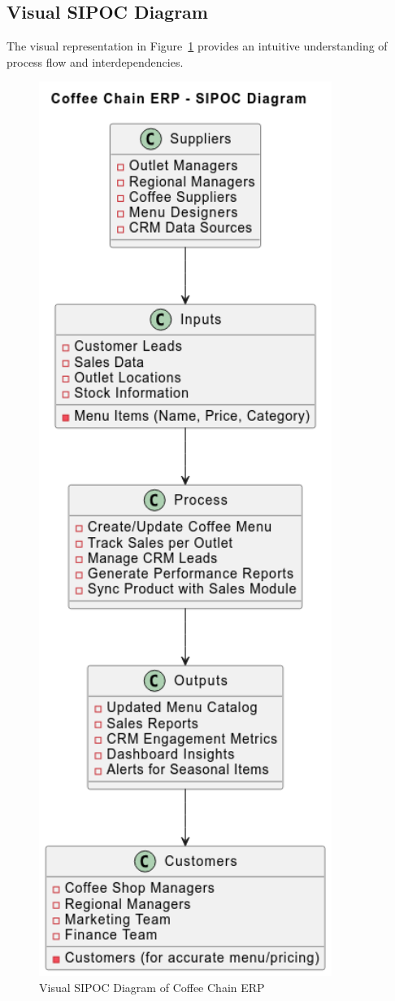 \subsection*{Visual SIPOC Diagram}
The visual representation in Figure~\ref{fig:sipoc_visual} provides an intuitive understanding of process flow and interdependencies.
\begin{figure}[H]
\centering
\includegraphics[width=0.85\textwidth,height=0.6\textheight,keepaspectratio]{diagrams/SIPOC.png}
\caption{Visual SIPOC Diagram of Coffee Chain ERP}
\label{fig:sipoc_visual}
\end{figure}

